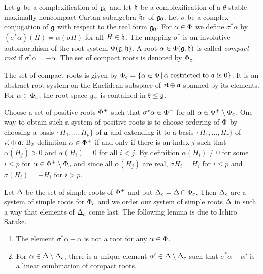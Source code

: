 Let $\mathfrak{g}$ be a complexification of $\mathfrak{g}_0$ and let $\mathfrak{h}$ be a complexification of a $\theta$-stable maximally noncompact Cartan subalgebra $\mathfrak{h}_0$ of $\mathfrak{g}_0$. Let $\sigma$ be a complex conjugation of $\mathfrak{g}$ with respect to the real form $\mathfrak{g}_0$. For $\alpha\in\Phi$ we define $\sigma^* \alpha$ by $(\sigma^* \alpha) (H) = \overline{\alpha(\sigma H)}$ for all $H\in\mathfrak{h}$. The mapping $\sigma^*$ is an involutive automorphism of the root system $\Phi(\mathfrak{g},\mathfrak{h})$. A root $\alpha \in \Phi(\mathfrak{g},\mathfrak{h})$ is called \emph{compact root} if $\sigma^*\alpha = -\alpha$. The set of compact roots is denoted by $\Phi_c$.

\begin{proposition}
 The set of compact roots is given by $\Phi_c = \{ \alpha \in \Phi \,|\,\alpha \text{ restricted to } \mathfrak{a} \text{ is } 0 \}$. It is an abstract root system on the Euclidean subspace of $\imath \mathfrak{t}\oplus \mathfrak{a}$ spanned by its elements. For $\alpha\in\Phi_c$, the root space $\mathfrak{g}_\alpha$ is contained in $\mathfrak{k}\leq \mathfrak{g}$.
\end{proposition}


Choose a set of positive roots $\Phi^+$ such that $\sigma^* \alpha \in \Phi^+$ for all $\alpha\in\Phi^+\setminus\Phi_c$. One way to obtain such a system of positive roots is to choose ordering of $\Phi$ by choosing a basis $\{H_1,\ldots, H_p\}$ of $\mathfrak{a}$ and extending it to a basis $\{H_1,\ldots,H_r\}$ of $\imath\mathfrak{t}\oplus\mathfrak{a}$. By definition $\alpha\in\Phi^+$ if and only if there is an index $j$ such that $\alpha(H_j) > 0$ and $\alpha(H_i) = 0 $ for all $i<j$. By definition $\alpha(H_i)\neq 0$ for some $i\leq p$ for $\alpha \in \Phi^+\setminus \Phi_c$ and since all $\alpha(H_j)$ are real, $\sigma H_i = H_i$ for $i\leq p$ and $\sigma(H_i) = -H_i$ for $i>p$.

Let $\Delta$ be the set of simple roots of $\Phi^+$ and put $\Delta_c = \Delta \cap \Phi_c$. Then $\Delta_c$ are a system of simple roots for $\Phi_c$ and we order our system of simple roots $\Delta$ in such a way that elements of $\Delta_c$ come last. The following lemma is due to Ichir{o} Satake.
\begin{lemma}
\begin{enumerate}
 \item The element $\sigma^*\alpha - \alpha$ is not a root for any $\alpha\in\Phi$.
 \item For $\alpha \in \Delta \setminus \Delta_c$, there is a unique element $\alpha'\in\Delta\setminus\Delta_c$ such that $\sigma^*\alpha-\alpha'$ is a linear combination of compact roots.
\end{enumerate}
\end{lemma}

